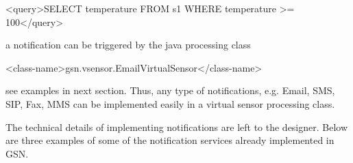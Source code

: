 \begin{xmlcode}
<query>SELECT temperature FROM s1 WHERE temperature >= 100</query>
\end{xmlcode}

a notification can be triggered  by the java processing class

\begin{xmlcode}
<class-name>gsn.vsensor.EmailVirtualSensor</class-name>
\end{xmlcode}

see examples in next section. Thus, any type of notifications, e.g. Email, SMS, SIP, Fax, MMS can be implemented easily in a virtual sensor processing class. 

The technical details of implementing notifications are left to the designer. Below are three examples of some of the notification services already implemented in GSN.






